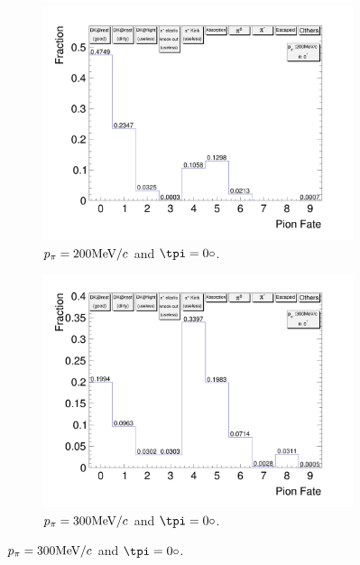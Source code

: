           \begin{figure}[t]
               \centering
               \begin{subfigure}{\dbfigwid\textwidth}
                    \includegraphics[width=\textwidth]{figures/sel/pion_fate_200_0.png}
                    \caption{$p_{\pi}=200\textrm{MeV}/c$ and $\tpi=0\deg$.}
                    \label{subfig:pi-fate-200-0}
               \end{subfigure}
               \begin{subfigure}{\dbfigwid\textwidth}
                    \includegraphics[width=\textwidth]{figures/sel/pion_fate_300_0.png}
                    \caption{$p_{\pi}=300\textrm{MeV}/c$ and $\tpi=0\deg$.}
                    \label{subfig:pi-fate-300-0}

\end{subfigure}
\end{figure}
